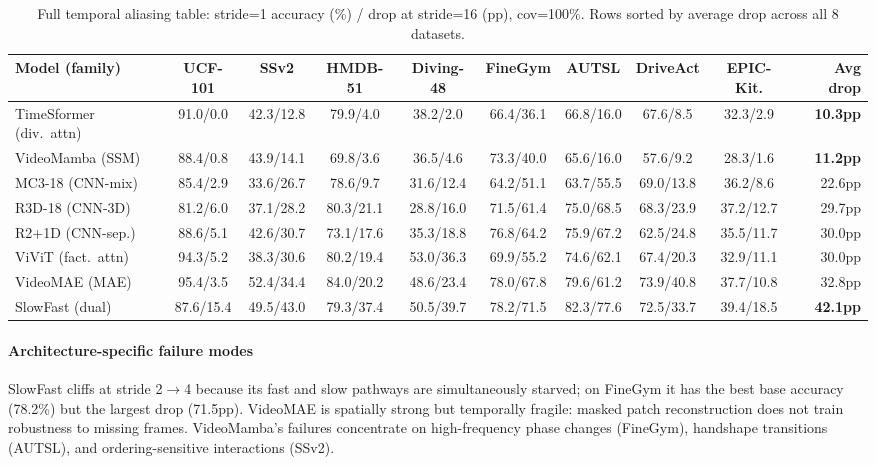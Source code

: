 \documentclass[a4paper, 10pt, conference]{ieeeconf}
\newcommand{\tabtight}{\setlength{\tabcolsep}{3.5pt}\renewcommand{\arraystretch}{1.10}}
\begin{document}
\begin{table}[t]
\centering
\caption{Full temporal aliasing table: stride=1 accuracy (\%) / drop at stride=16 (pp), cov=100\%. Rows sorted by average drop across all 8 datasets.}
\label{tab:e1_full}
\scriptsize\tabtight
\begin{adjustbox}{max width=\textwidth}
\begin{tabular}{l @{\hskip4pt} cccccccc @{\hskip4pt} r}
\toprule
Model (family) & UCF-101 & SSv2 & HMDB-51 & Diving-48 & FineGym & AUTSL & DriveAct & EPIC-Kit. & Avg drop \\
\midrule
TimeSformer (div.\ attn) & 91.0/0.0 & 42.3/12.8 & 79.9/4.0 & 38.2/2.0 & 66.4/36.1 & 66.8/16.0 & 67.6/8.5 & 32.3/2.9 & \textbf{10.3pp} \\
VideoMamba (SSM)         & 88.4/0.8 & 43.9/14.1 & 69.8/3.6 & 36.5/4.6 & 73.3/40.0 & 65.6/16.0 & 57.6/9.2 & 28.3/1.6 & \textbf{11.2pp} \\
\midrule
MC3-18 (CNN-mix)  & 85.4/2.9  & 33.6/26.7 & 78.6/9.7  & 31.6/12.4 & 64.2/51.1 & 63.7/55.5 & 69.0/13.8 & 36.2/8.6  & 22.6pp \\
R3D-18 (CNN-3D)   & 81.2/6.0  & 37.1/28.2 & 80.3/21.1 & 28.8/16.0 & 71.5/61.4 & 75.0/68.5 & 68.3/23.9 & 37.2/12.7 & 29.7pp \\
R2+1D (CNN-sep.)  & 88.6/5.1  & 42.6/30.7 & 73.1/17.6 & 35.3/18.8 & 76.8/64.2 & 75.9/67.2 & 62.5/24.8 & 35.5/11.7 & 30.0pp \\
ViViT (fact.\ attn) & 94.3/5.2 & 38.3/30.6 & 80.2/19.4 & 53.0/36.3 & 69.9/55.2 & 74.6/62.1 & 67.4/20.3 & 32.9/11.1 & 30.0pp \\
VideoMAE (MAE)    & 95.4/3.5  & 52.4/34.4 & 84.0/20.2 & 48.6/23.4 & 78.0/67.8 & 79.6/61.2 & 73.9/40.8 & 37.7/10.8 & 32.8pp \\
SlowFast (dual)   & 87.6/15.4 & 49.5/43.0 & 79.3/37.4 & 50.5/39.7 & 78.2/71.5 & 82.3/77.6 & 72.5/33.7 & 39.4/18.5 & \textbf{42.1pp} \\
\bottomrule
\end{tabular}
\end{adjustbox}
\end{table}

\paragraph{Architecture-specific failure modes}
SlowFast cliffs at stride 2$\to$4 because its fast and slow pathways are simultaneously starved; on FineGym it has the best base accuracy (78.2\%) but the largest drop (71.5pp). VideoMAE is spatially strong but temporally fragile: masked patch reconstruction does not train robustness to missing frames. VideoMamba's failures concentrate on high-frequency phase changes (FineGym), handshape transitions (AUTSL), and ordering-sensitive interactions (SSv2).
\end{document}

